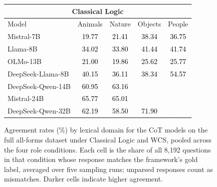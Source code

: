\begin{figure}[H]
\centering
\caption{Agreement rates (\%) by lexical domain for the CoT models on the full all-forms dataset under Classical Logic and WCS, pooled across the four role conditions. Each cell is the share of all 8,192 questions in that condition whose response matches the framework's gold label, averaged over five sampling runs; unparsed responses count as mismatches. Darker cells indicate higher agreement.}
\label{fig:domain-heatmap-final2}
\small
\begin{tabular}{lcccc}
\multicolumn{5}{c}{\textbf{Classical Logic}} \\
\toprule
Model & Animals & Nature & Objects & People \\
\midrule
Mistral-7B & \cellcolor[HTML]{D8E4DB}\textcolor{black}{19.77} & \cellcolor[HTML]{D6E3D9}\textcolor{black}{21.41} & \cellcolor[HTML]{B5CCBB}\textcolor{black}{38.34} & \cellcolor[HTML]{B7CDBC}\textcolor{black}{36.75} \\
Llama-8B & \cellcolor[HTML]{BDD1C2}\textcolor{black}{34.02} & \cellcolor[HTML]{BDD1C2}\textcolor{black}{33.80} & \cellcolor[HTML]{AFC8B5}\textcolor{black}{41.44} & \cellcolor[HTML]{ADC6B3}\textcolor{black}{41.74} \\
OLMo-13B & \cellcolor[HTML]{D6E3D9}\textcolor{black}{21.00} & \cellcolor[HTML]{D8E4DB}\textcolor{black}{19.86} & \cellcolor[HTML]{CCDCD0}\textcolor{black}{25.62} & \cellcolor[HTML]{CCDCD0}\textcolor{black}{25.77} \\
DeepSeek-Llama-8B & \cellcolor[HTML]{B1C9B7}\textcolor{black}{40.15} & \cellcolor[HTML]{B9CEBE}\textcolor{black}{36.11} & \cellcolor[HTML]{B5CCBB}\textcolor{black}{38.34} & \cellcolor[HTML]{94B59C}\textcolor{black}{54.57} \\
DeepSeek-Qwen-14B & \cellcolor[HTML]{88AD91}\textcolor{black}{60.95} & \cellcolor[HTML]{84AA8E}\textcolor{black}{63.16} & \cellcolor[HTML]{6D9A78}\textcolor{white}{74.92} & \cellcolor[HTML]{61926D}\textcolor{white}{80.58} \\
Mistral-24B & \cellcolor[HTML]{7EA688}\textcolor{black}{65.77} & \cellcolor[HTML]{80A78A}\textcolor{black}{65.01} & \cellcolor[HTML]{719C7C}\textcolor{white}{72.91} & \cellcolor[HTML]{6D9A78}\textcolor{white}{74.90} \\
DeepSeek-Qwen-32B & \cellcolor[HTML]{86AB8F}\textcolor{black}{62.19} & \cellcolor[HTML]{8EB197}\textcolor{black}{58.50} & \cellcolor[HTML]{739E7D}\textcolor{black}{71.90} & \cellcolor[HTML]{5D8F6A}\textcolor{white}{82.73} \\

\end{tabular}
\end{figure}
